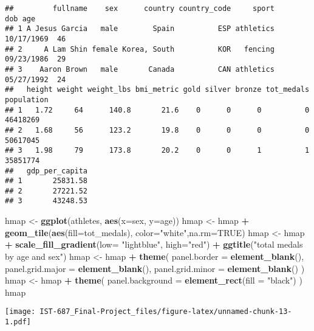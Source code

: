 \documentclass[]{article}
\newenvironment{Shaded}{\begin{snugshade}}{\end{snugshade}}
\newcommand{\DataTypeTok}[1]{\textcolor[rgb]{0.13,0.29,0.53}{#1}}
\newcommand{\KeywordTok}[1]{\textcolor[rgb]{0.13,0.29,0.53}{\textbf{#1}}}
\newcommand{\NormalTok}[1]{#1}
\newcommand{\OperatorTok}[1]{\textcolor[rgb]{0.81,0.36,0.00}{\textbf{#1}}}
\newcommand{\OtherTok}[1]{\textcolor[rgb]{0.56,0.35,0.01}{#1}}
\newcommand{\StringTok}[1]{\textcolor[rgb]{0.31,0.60,0.02}{#1}}
\begin{document}
\begin{verbatim}
##         fullname    sex      country country_code     sport        dob age
## 1 A Jesus Garcia   male        Spain          ESP athletics 10/17/1969  46
## 2     A Lam Shin female Korea, South          KOR   fencing 09/23/1986  29
## 3    Aaron Brown   male       Canada          CAN athletics 05/27/1992  24
##   height weight weight_lbs bmi_metric gold silver bronze tot_medals population
## 1   1.72     64      140.8       21.6    0      0      0          0   46418269
## 2   1.68     56      123.2       19.8    0      0      0          0   50617045
## 3   1.98     79      173.8       20.2    0      0      1          1   35851774
##   gdp_per_capita
## 1       25831.58
## 2       27221.52
## 3       43248.53
\end{verbatim}

\begin{Shaded}
\begin{Highlighting}[]
\NormalTok{hmap <-}\StringTok{ }\KeywordTok{ggplot}\NormalTok{(athletes, }\KeywordTok{aes}\NormalTok{(}\DataTypeTok{x=}\NormalTok{sex, }\DataTypeTok{y=}\NormalTok{age))}
\NormalTok{hmap <-}\StringTok{ }\NormalTok{hmap }\OperatorTok{+}\StringTok{ }\KeywordTok{geom_tile}\NormalTok{(}\KeywordTok{aes}\NormalTok{(}\DataTypeTok{fill=}\NormalTok{tot_medals), }\DataTypeTok{color=}\StringTok{"white"}\NormalTok{,}\DataTypeTok{na.rm=}\OtherTok{TRUE}\NormalTok{) }
\NormalTok{hmap <-}\StringTok{ }\NormalTok{hmap }\OperatorTok{+}\StringTok{ }\KeywordTok{scale_fill_gradient}\NormalTok{(}\DataTypeTok{low=} \StringTok{"lightblue"}\NormalTok{, }\DataTypeTok{high=}\StringTok{"red"}\NormalTok{) }\OperatorTok{+}\StringTok{ }\KeywordTok{ggtitle}\NormalTok{(}\StringTok{"total medals by age and sex"}\NormalTok{)}
\NormalTok{hmap <-}\StringTok{ }\NormalTok{hmap }\OperatorTok{+}\StringTok{ }\KeywordTok{theme}\NormalTok{(}
  \DataTypeTok{panel.border =} \KeywordTok{element_blank}\NormalTok{(),}
  \DataTypeTok{panel.grid.major =} \KeywordTok{element_blank}\NormalTok{(),}
  \DataTypeTok{panel.grid.minor =} \KeywordTok{element_blank}\NormalTok{()}
\NormalTok{)}
\NormalTok{hmap <-}\StringTok{ }\NormalTok{hmap }\OperatorTok{+}\StringTok{ }\KeywordTok{theme}\NormalTok{(}
  \DataTypeTok{panel.background =} \KeywordTok{element_rect}\NormalTok{(}\DataTypeTok{fill =} \StringTok{"black"}\NormalTok{)}
\NormalTok{) }
\NormalTok{hmap }
\end{Highlighting}
\end{Shaded}

\texttt{[image: IST-687\_Final-Project\_files/figure-latex/unnamed-chunk-13-1.pdf]}
\end{document}
